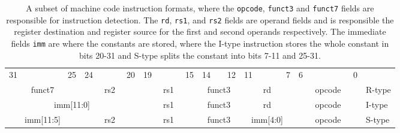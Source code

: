     \begin{table}[h!]
        \scriptsize
        \begin{tabular} %
            {p{0.01mm}p{0.01mm}p{0.01mm}p{0.01mm} p{0.01mm}p{0.01mm}p{0.01mm}p{0.01mm}
                p{0.01mm}p{0.01mm}p{0.01mm}p{0.01mm} p{0.01mm}p{0.01mm}p{0.01mm}p{0.01mm}
                p{0.01mm}p{0.01mm}p{0.01mm}p{0.01mm} p{0.01mm}p{0.01mm}p{0.01mm}p{0.01mm}
                p{0.01mm}p{0.01mm}p{0.01mm}p{0.01mm} p{0.01mm}p{0.01mm}p{0.01mm}p{0.01mm} l}
            \multicolumn{1}{c}{31}&&&&&&
            \multicolumn{1}{c}{25}&
            \multicolumn{1}{c}{24}&&&&
            \multicolumn{1}{c}{20}&
            \multicolumn{1}{c}{19}&&&&
            \multicolumn{1}{c}{15}&
            \multicolumn{1}{c}{14}&&
            \multicolumn{1}{c}{12}&
            \multicolumn{1}{c}{11}&&&&
            \multicolumn{1}{c}{7}&
            \multicolumn{1}{c}{6}&&&&&&
            \multicolumn{1}{c}{0}&
            \\
            \cline{0-31} 
            \multicolumn{7}{|c|}{funct7} &
            \multicolumn{5}{c|}{rs2}&
            \multicolumn{5}{c|}{rs1}&
            \multicolumn{3}{c|}{funct3}&
            \multicolumn{5}{c|}{rd}&
            \multicolumn{7}{c|}{opcode}&
            R-type
            \\
            \cline{0-31} 
            \multicolumn{12}{|c|}{imm[11:0]} &
            \multicolumn{5}{c|}{rs1}&
            \multicolumn{3}{c|}{funct3}&
            \multicolumn{5}{c|}{rd}&
            \multicolumn{7}{c|}{opcode}&
            I-type
            \\
            \cline{0-31} 
            \multicolumn{7}{|c|}{imm[11:5]} &
            \multicolumn{5}{c|}{rs2}&
            \multicolumn{5}{c|}{rs1}&
            \multicolumn{3}{c|}{funct3}&
            \multicolumn{5}{c|}{imm[4:0]}&
            \multicolumn{7}{c|}{opcode}&
            S-type
            \\
            \cline{0-31} 
        \end{tabular}
        \caption{A subset of machine code instruction formats, where the \texttt{opcode}, \texttt{funct3} and \texttt{funct7} fields are responsible for instruction detection. The \texttt{rd}, \texttt{rs1}, and \texttt{rs2} fields are operand fields and is responsible the register destination and register source for the first and second operands respectively. The immediate fields \texttt{imm} are where the constants are stored, where the I-type instruction stores the whole constant in bits 20-31 and S-type splits the constant into bits 7-11 and 25-31.}
        \label{table:InstructionFormats}
    \end{table}

